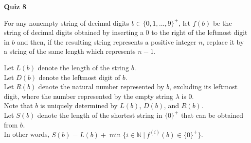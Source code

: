 \documentclass[11pt]{article}
\def\nats {{\mathbb N}}
\begin{document}
{\bf \large Quiz 8}

\medskip

\begin{question}
For any nonempty string of decimal digits $b \in \{0,1, \ldots, 9\}^+$,
let $f(b)$ be the string of decimal digits obtained by
inserting a 0 to the right of the leftmost digit in $b$ and then, if the resulting string represents a positive integer $n$, replace it by a string of the same length which represents $n-1$.

Let $L(b)$ denote the length of the string $b$.\\
Let $D(b)$ denote the leftmost digit of $b$.\\
Let $R(b)$ denote the natural number represented
by $b$, excluding its leftmost digit, where the number represented by the empty string $\lambda$ is 0.\\
Note that $b$ is uniquely determined by $L(b)$, $D(b)$, and $R(b)$.\\
Let $S(b)$ denote the length of the shortest string in $\{0\}^+$ that can be obtained from $b$. \\
In other words, $S(b) = L(b) + \min\{ i \in \nats\ |\ f^{(i)}(b) \in \{0\}^+\}$.
\end{question}
\end{document}
